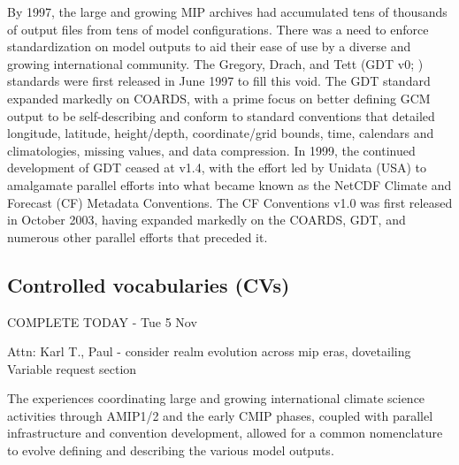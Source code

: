 \documentclass[gmd, preprint]{copernicus}
\newcommand{\mycomment}[1]{}
\def\cred#1{{\color{red}#1}}
\def\cblue#1{{\color{blue}#1}}
\begin{document}
By 1997, the large and growing MIP archives had accumulated tens of thousands of output files from tens of model configurations. There was a need to enforce standardization on model outputs to aid their ease of use by a diverse and growing international community. The Gregory, Drach, and Tett (GDT v0; \citet{gregory_gdt_1999}) standards were first released in June 1997 to fill this void. The GDT standard expanded markedly on COARDS, with a prime focus on better defining GCM output to be self-describing and conform to standard conventions that detailed longitude, latitude, height/depth, coordinate/grid bounds, time, calendars and climatologies, missing values, and data compression. In 1999, the continued development of GDT ceased at v1.4, with the effort led by Unidata (USA) to amalgamate parallel efforts into what became known as the NetCDF Climate and Forecast (CF) Metadata Conventions. The CF Conventions v1.0 was first released in October 2003, having expanded markedly on the COARDS, GDT, and numerous other parallel efforts that preceded it.


\mycomment{
https://www.unidata.ucar.edu/software/netcdf/conventions.html
https://www.unidata.ucar.edu/software/netcdf/coords/proposals.html
COARDS 1995 - https://web.archive.org/web/20100527095818/http://ferret.wrc.noaa.gov/noaa_coop/coop_cdf_profile.html
GDT 1997
https://www.unidata.ucar.edu/mailing_lists/archives/netcdfgroup/1997/msg00080.html
https://www.unidata.ucar.edu/software/netcdf/coords/0054.html 1997
https://web.archive.org/web/20100610102527/http://www-pcmdi.llnl.gov/drach/GDT_convention.html 1999
https://web.archive.org/web/20040604041414/http://www-pcmdi.llnl.gov/drach/netCDF.html
CF 2003 - https://cfconventions.org/Data/cf-conventions/cf-conventions-1.11/cf-conventions.html#_version_1_0_28_october_2003 
}


\subsection{Controlled vocabularies (CVs)}
\label{sec:CMIPCVs}
\cblue{COMPLETE TODAY - Tue 5 Nov}

\cred{Attn: Karl T., Paul - consider realm evolution across mip eras, dovetailing Variable request section}

The experiences coordinating large and growing international climate science activities through AMIP1/2 and the early CMIP phases, coupled with parallel infrastructure and convention development, allowed for a common nomenclature to evolve defining and describing the various model outputs.
\end{document}
